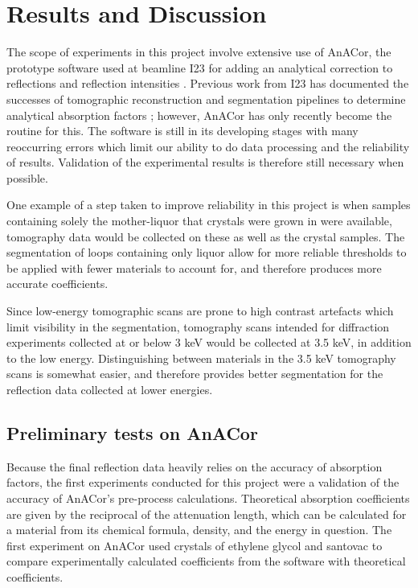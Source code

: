 \section{Results and Discussion}

The scope of experiments in this project involve extensive use of AnACor, the prototype software used at beamline I23 for adding an analytical correction to reflections and reflection intensities \cite{Lu}. Previous work from I23 has documented the successes of tomographic reconstruction and segmentation pipelines to determine analytical absorption factors \cite{Kazantsev2021}; however, AnACor has only recently become the routine for this. The software is still in its developing stages with many reoccurring errors which limit our ability to do data processing and the reliability of results. Validation of the experimental results is therefore still necessary when possible.

One example of a step taken to improve reliability in this project is when samples containing solely the mother-liquor that crystals were grown in were available, tomography data would be collected on these as well as the crystal samples. The segmentation of loops containing only liquor allow for more reliable thresholds to be applied with fewer materials to account for, and therefore produces more accurate coefficients.

Since low-energy tomographic scans are prone to high contrast artefacts which limit visibility in the segmentation, tomography scans intended for diffraction experiments collected at or below 3 keV would be collected at 3.5 keV, in addition to the low energy. Distinguishing between materials in the 3.5 keV tomography scans is somewhat easier, and therefore provides better segmentation for the reflection data collected at lower energies.


\subsection{Preliminary tests on AnACor}

Because the final reflection data heavily relies on the accuracy of absorption factors, the first experiments conducted for this project were a validation of the accuracy of AnACor's pre-process calculations. Theoretical absorption coefficients are given by the reciprocal of the attenuation length, which can be calculated for a material from its chemical formula, density, and the energy in question. The first experiment on AnACor used crystals of ethylene glycol and santovac to compare experimentally calculated coefficients from the software with theoretical coefficients.


